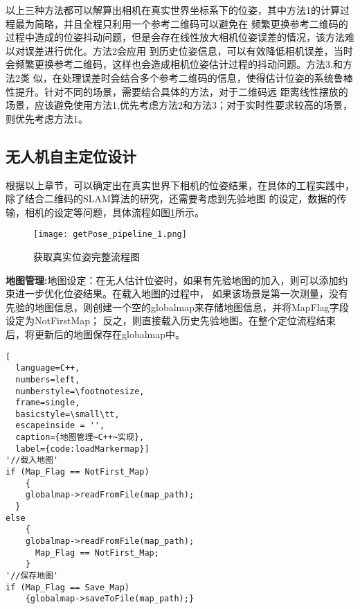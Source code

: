 以上三种方法都可以解算出相机在真实世界坐标系下的位姿，其中方法1的计算过程最为简略，并且全程只利用一个参考二维码可以避免在
频繁更换参考二维码的过程中造成的位姿抖动问题，但是会存在线性放大相机位姿误差的情况，该方法难以对误差进行优化。方法2会应用
到历史位姿信息，可以有效降低相机误差，当时会频繁更换参考二维码，这样也会造成相机位姿估计过程的抖动问题。方法3.和方法2类
似，在处理误差时会结合多个参考二维码的信息，使得估计位姿的系统鲁棒性提升。针对不同的场景，需要结合具体的方法，对于二维码远
距离线性摆放的场景，应该避免使用方法1,优先考虑方法2和方法3；对于实时性要求较高的场景，则优先考虑方法1。


\subsection{无人机自主定位设计}
\label{sec:2.4.3}
根据以上章节，可以确定出在真实世界下相机的位姿结果，在具体的工程实践中，除了结合二维码的SLAM算法的研究，还需要考虑到先验地图
的设定，数据的传输，相机的设定等问题，具体流程如图\ref{fig:getPose_pipeline}所示。
\begin{figure}[t] %
  \centering
  \texttt{[image: getPose\_pipeline\_1.png]}
  \caption{获取真实位姿完整流程图}
  \label{fig:getPose_pipeline}
\end{figure}


\textbf{地图管理:}地图设定：在无人估计位姿时，如果有先验地图的加入，则可以添加约束进一步优化位姿结果。在载入地图的过程中，
如果该场景是第一次测量，没有先验的地图信息，则创建一个空的globalmap来存储地图信息，并将MapFlag字段设定为NotFirstMap；
反之，则直接载入历史先验地图。在整个定位流程结束后，将更新后的地图保存在globalmap中。
\begin{lstlisting}[
  language=C++,
  numbers=left,                
  numberstyle=\footnotesize,
  frame=single,     
  basicstyle=\small\tt,    
  escapeinside = '',
  caption={地图管理~C++~实现},
  label={code:loadMarkermap}]
'//载入地图'
if (Map_Flag == NotFirst_Map) 
	{
    globalmap->readFromFile(map_path);
  }
else
	{
    globalmap->readFromFile(map_path);
	  Map_Flag == NotFirst_Map;
	}
'//保存地图'
if (Map_Flag == Save_Map) 
    {globalmap->saveToFile(map_path);}
\end{lstlisting}


